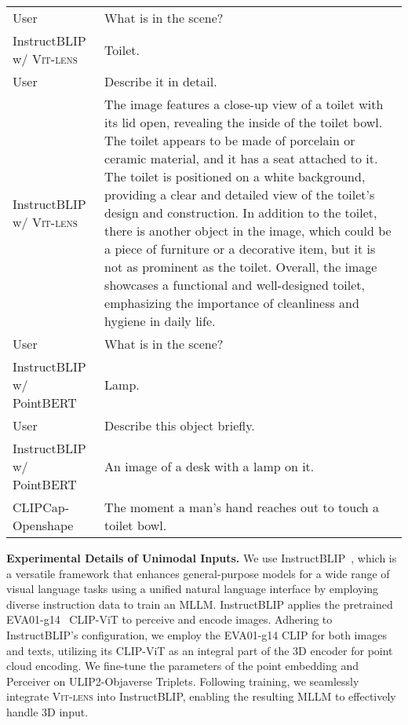 \documentclass{article}
\newcommand{\clipvit}{CLIP-ViT\xspace}
\newcommand{\methodname}{{\scshape Vit-lens}\xspace}
\newcommand{\dsB}{{\textcolor{mygreen}{}}}
\begin{document}
\begin{table}[h]
\begin{minipage}{0.99\textwidth}
{\begin{tabular}{l p{10.5cm} }
User & What is in the scene? \\
InstructBLIP w/ \methodname & Toilet.\\
User & Describe it in detail. \\
InstructBLIP w/ \methodname & The image features a close-up view of a toilet with its lid open, revealing the inside of the toilet bowl. The toilet appears to be made of porcelain or ceramic material, and it has a seat attached to it. The toilet is positioned on a white background, providing a clear and detailed view of the toilet's design and construction. In addition to the toilet, there is another object in the image, which could be a piece of furniture or a decorative item, but it is not as prominent as the toilet. Overall, the image showcases a functional and well-designed toilet, emphasizing the importance of cleanliness and hygiene in daily life.
\\
\midrule
User & What is in the scene? \\
InstructBLIP w/ PointBERT &  Lamp. \\
User & Describe this object briefly. \\
InstructBLIP w/ PointBERT & An image of a desk with a lamp on it. \\
\midrule
CLIPCap-Openshape~\cite{mokady2021clipcap,liu2023openshape} & The moment a man's hand reaches out to touch a toilet bowl. \\
\bottomrule
\end{tabular}
} 
\end{minipage}
\end{table} 
\textbf{Experimental Details of Unimodal Inputs.} We use InstructBLIP~\cite{dai2023instructblip}, which is a versatile framework that enhances general-purpose models for a wide range of visual language tasks using a unified natural language interface by employing diverse instruction data to train an MLLM. InstructBLIP applies the pretrained EVA01-g14~\cite{fang2023eva} \clipvit to perceive and encode images. 
Adhering to InstructBLIP's configuration, we employ the EVA01-g14 CLIP for both images and texts, utilizing its \clipvit as an integral part of the 3D encoder for point cloud encoding. We fine-tune the parameters of the point embedding and Perceiver on \dsB ULIP2-Objaverse Triplets. Following training, we seamlessly integrate \methodname into InstructBLIP, enabling the resulting MLLM to effectively handle 3D input. 
\end{document}
